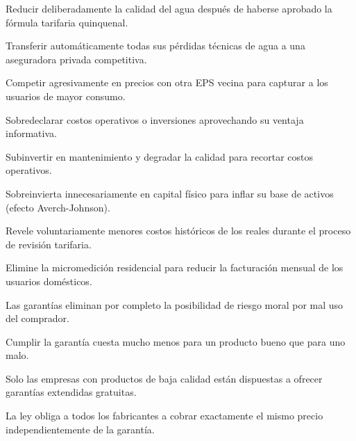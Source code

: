 \begin{opts}
    \item Reducir deliberadamente la calidad del agua después de haberse aprobado la fórmula tarifaria quinquenal.
    \item Transferir automáticamente todas sus pérdidas técnicas de agua a una aseguradora privada competitiva.
    \item Competir agresivamente en precios con otra EPS vecina para capturar a los usuarios de mayor consumo.
    \item Sobredeclarar costos operativos o inversiones aprovechando su ventaja informativa.
\end{opts}

\begin{opts}
    \item Subinvertir en mantenimiento y degradar la calidad para recortar costos operativos.
    \item Sobreinvierta innecesariamente en capital físico para inflar su base de activos (efecto Averch-Johnson).
    \item Revele voluntariamente menores costos históricos de los reales durante el proceso de revisión tarifaria.
    \item Elimine la micromedición residencial para reducir la facturación mensual de los usuarios domésticos.
\end{opts}

\begin{opts}
    \item Las garantías eliminan por completo la posibilidad de riesgo moral por mal uso del comprador.
    \item Cumplir la garantía cuesta mucho menos para un producto bueno que para uno malo.
    \item Solo las empresas con productos de baja calidad están dispuestas a ofrecer garantías extendidas gratuitas.
    \item La ley obliga a todos los fabricantes a cobrar exactamente el mismo precio independientemente de la garantía.
\end{opts}

